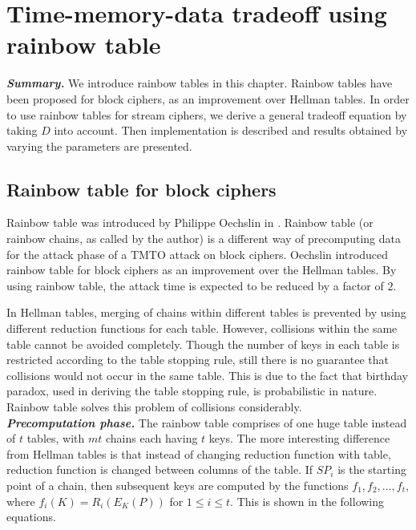 \chapter{Time-memory-data tradeoff using rainbow table}
\label{chapter:tmdto-rainbow}

\indent \textbf{\textit{Summary.}} We introduce rainbow tables in this chapter. Rainbow tables have been proposed for block ciphers, as an improvement over Hellman tables. In order to use rainbow tables for stream ciphers, we derive a general tradeoff equation by taking $D$ into account. Then implementation is described and results obtained by varying the parameters are presented.

\section{Rainbow table for block ciphers}
\label{sec:rainbow-block}

Rainbow table was introduced by Philippe Oechslin in \cite{oechslin:mfc}. Rainbow table (or rainbow chains, as called by the author) is a different way of precomputing data for the attack phase of a TMTO attack on block ciphers. Oechslin introduced rainbow table for block ciphers as an improvement over the Hellman tables. By using rainbow table, the attack time is expected to be reduced by a factor of $2$.

In Hellman tables, merging of chains within different tables is prevented by using different reduction functions for each table. However, collisions within the same table cannot be avoided completely. Though the number of keys in each table is restricted according to the table stopping rule, still there is no guarantee that collisions would not occur in the same table. This is due to the fact that birthday paradox, used in deriving the table stopping rule, is probabilistic in nature. Rainbow table solves this problem of collisions considerably.\\

\noindent \textit{\textbf{Precomputation phase.}} The rainbow table comprises of one huge table instead of $t$ tables, with $mt$ chains each having $t$ keys. The more interesting difference from Hellman tables is that instead of changing reduction function with table, reduction function is changed between columns of the table. If $SP_i$ is the starting point of a chain, then subsequent keys are computed by the functions \mbox{$f_1, f_2, \ldots , f_t$}, where $f_i(K) = R_i(E_{K}(P))$ for $1 \leq i \leq t$. This is shown in the following equations. 


